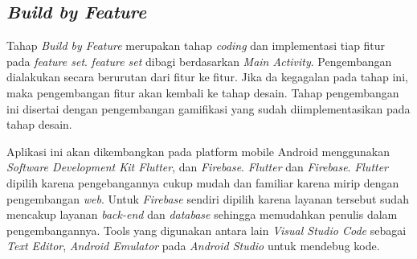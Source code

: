 \subsection{\textit{Build by Feature}}
Tahap \textit{Build by Feature} merupakan tahap \textit{coding} dan implementasi tiap fitur pada \textit{feature set}.
\textit{feature set} dibagi berdasarkan \textit{Main Activity}. Pengembangan dialakukan secara berurutan dari fitur ke fitur.
Jika da kegagalan pada tahap ini, maka pengembangan fitur akan kembali ke tahap desain.
Tahap pengembangan ini disertai dengan pengembangan gamifikasi yang sudah diimplementasikan pada tahap desain.

Aplikasi ini akan dikembangkan pada platform mobile Android menggunakan \textit{Software Development Kit Flutter}, dan \textit{Firebase}.
\textit{Flutter} dan \textit{Firebase}. \textit{Flutter} dipilih karena pengebangannya cukup mudah dan familiar karena mirip dengan pengembangan \textit{web}.
Untuk \textit{Firebase} sendiri dipilih karena layanan tersebut sudah mencakup layanan \textit{back-end} dan \textit{database} sehingga memudahkan penulis dalam pengembangannya.
Tools yang digunakan antara lain \textit{Visual Studio Code} sebagai \textit{Text Editor}, \textit{Android Emulator} pada \textit{Android Studio} untuk mendebug kode.
